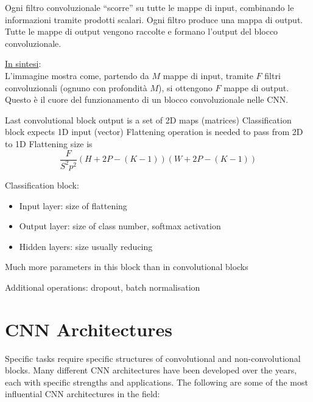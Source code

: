 Ogni filtro convoluzionale ``scorre'' su tutte le mappe di input, combinando le informazioni tramite prodotti scalari.
Ogni filtro produce una mappa di output.
Tutte le mappe di output vengono raccolte e formano l'output del blocco convoluzionale.
\nl

\ul{In sintesi}:\\
L'immagine mostra come, partendo da $M$ mappe di input, tramite $F$ filtri convoluzionali (ognuno con profondità $M$), si ottengono $F$ mappe di output. Questo è il cuore del funzionamento di un blocco convoluzionale nelle CNN.
\nl
\nl


Last convolutional block output is a set of 2D maps (matrices)
Classification block expects 1D input (vector)
Flattening operation is needed to pass from 2D to 1D
Flattening size is
\[\frac{F}{S^2p^2} (H + 2P - (K - 1))(W + 2P - (K-1))\]

Classification block:
\begin{itemize}
	\item Input layer: size of flattening
	\item Output layer: size of class number, softmax activation
	\item Hidden layers: size usually reducing
\end{itemize}

Much more parameters in this block than in convolutional blocks

Additional operations: dropout, batch normalisation

\section{CNN Architectures}
Specific tasks require specific structures of convolutional and
non-convolutional blocks.
Many different CNN architectures have been developed over the years, each with specific strengths and applications. The following are some of the most influential CNN architectures in the field:


